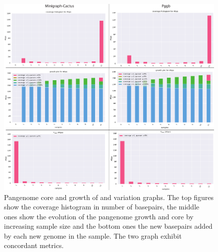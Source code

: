 \begin{figure}[h!]
	\centering
	\includegraphics[width=\textwidth]{figures/lodelo/fig_lodelo_export.pdf}
	\caption[Pangenome core and growth of \pggb and \mcactus variation graphs.]{Pangenome core and growth of \pggb and \mcactus variation graphs. The top figures show the coverage histogram in number of basepairs, the middle ones show the evolution of the pangenome growth and core by increasing sample size and the bottom ones the new basepairs added by each new genome in the sample. The two graph exhibit concordant metrics.}
	\label{fig:panacus}
\end{figure}


\printbibliography